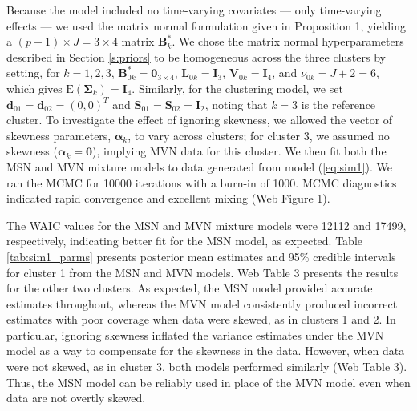 \documentclass[useAMS,usenatbib,referee]{biom}
\begin{document}
Because the model included no time-varying covariates --- only time-varying effects --- we used the matrix normal formulation given in Proposition 1, yielding a $(p+1)\times J=3 \times 4$ matrix $\mathbf{B}_k^*$. We chose the matrix normal hyperparameters described in Section \ref{s:priors} to be homogeneous across the three clusters by setting, for $k = 1,2,3$, $\mathbf{B}_{0k}^* = \mathbf{0}_{3 \times 4}$, $\mathbf{L}_{0k}=\mathbf{I}_{3}$, $\mathbf{V}_{0k} = \mathbf{I}_{4}$, and $\nu_{0k} = J + 2 = 6$, which gives $\text{E}(\boldsymbol\Sigma_k) = \mathbf{I}_{4}$. Similarly, for the clustering model, we set $\mathbf{d}_{01} = \mathbf{d}_{02} = (0,0)^T$ and $\mathbf{S}_{01} = \mathbf{S}_{02} = \mathbf{I}_{2}$, noting that $k = 3$ is the reference cluster. To investigate the effect of ignoring skewness, we allowed the vector of skewness parameters, $\boldsymbol\alpha_k$, to vary across clusters; for cluster 3, we assumed no skewness ($\boldsymbol\alpha_k=\boldsymbol0$), implying MVN data for this cluster. We then fit both the MSN and MVN mixture models to data generated from model (\ref{eq:sim1}). We ran the MCMC for 10000 iterations with a burn-in of 1000. MCMC diagnostics indicated rapid convergence and excellent mixing (Web Figure 1).

The WAIC values for the MSN and MVN mixture models were 12112 and 17499, respectively, indicating better fit for the MSN model, as expected. Table \ref{tab:sim1_parms} presents posterior mean estimates and 95\% credible intervals for cluster 1 from the MSN and MVN models. Web Table 3 presents the results for the other two clusters. As expected, the MSN model provided accurate estimates throughout, whereas the MVN model consistently produced incorrect estimates with poor coverage when data were skewed, as in clusters 1 and 2. In particular, ignoring skewness inflated the variance estimates under the MVN model as a way to compensate for the skewness in the data. However, when data were not skewed, as in cluster 3, both models performed similarly (Web Table 3). Thus, the MSN model can be reliably used in place of the MVN model even when data are not overtly skewed.
\end{document}

